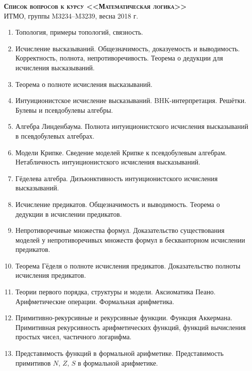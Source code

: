 \documentclass[11pt,a4paper,oneside]{scrartcl}
\begin{document}
\pagestyle{empty}

\begin{center}
{\large\scshape\bfseries Список вопросов к курсу <<Математическая логика>>}\\
ИТМО, группы M3234--M3239, весна 2018 г.
\end{center}


\begin{enumerate}
\item Топология, примеры топологий, связность.
\item Исчисление высказываний. Общезначимость, доказуемость и выводимость. Корректность, полнота, непротиворечивость.
Теорема о дедукции для исчисления высказываний.
\item Теорема о полноте исчисления высказываний.
\item Интуиционистское исчисление высказываний. BHK-интерпретация. Решётки. Булевы и псевдобулевы алгебры.
\item Алгебра Линденбаума. Полнота интуиционистского исчисления высказываний в псевдобулевых алгебрах.
\item Модели Крипке. Сведение моделей Крипке к псевдобулевым алгебрам. Нетабличность интуиционистского исчисления высказываний.
\item Гёделева алгебра. Дизъюнктивность интуиционистского исчисления высказываний.
\item Исчисление предикатов. Общезначимость и выводимость. Теорема о дедукции в исчислении предикатов.
\item Непротиворечивые множества формул. Доказательство существования моделей у непротиворечивых множеств формул 
в бескванторном исчислении предикатов.
\item Теорема Гёделя о полноте исчисления предикатов. Доказательство полноты исчисления предикатов.
\item Теории первого порядка, структуры и модели. Аксиоматика Пеано. Арифметические операции. Формальная арифметика. 
\item Примитивно-рекурсивные и рекурсивные функции. Функция Аккермана. Примитивная рекурсивность 
арифметических функций, функций вычисления простых чисел, частичного логарифма.
\item Представимость функций в формальной арифметике. Представимость примитивов $N$, $Z$, $S$ в формальной арифметике.

\end{enumerate}
\end{document}
